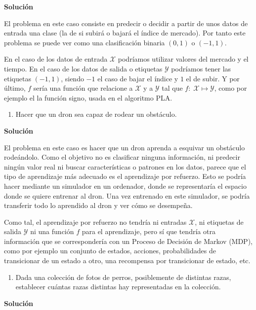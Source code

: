 \documentclass[11pt,a4paper]{article}
\newcommand{\answer}{\noindent\textbf{Solución}}
\begin{document}
\answer

El problema en este caso consiste en predecir o decidir a partir de unos datos de entrada una clase (la de si subirá o bajará
el índice de mercado). Por tanto este problema se puede ver como una clasificación binaria $(0, 1)$ o $(-1, 1)$.

En el caso de los datos de entrada $\mathcal{X}$ podríamos utilizar valores del mercado y el tiempo. En el caso de los datos
de salida o etiquetas $\mathcal{Y}$ podríamos tener las etiquetas $(-1, 1)$, siendo $-1$ el caso de bajar el índice y $1$ el
de subir. Y por último, $f$ sería una función que relacione a $\mathcal{X}$ y a $\mathcal{Y}$ tal que $f: \; \mathcal{X}
\mapsto \mathcal{Y}$, como por ejemplo el la función signo, usada en el algoritmo PLA.

\begin{enumerate}[resume,label=\textit{\alph*})]
	\item Hacer que un dron sea capaz de rodear un obstáculo.
\end{enumerate}

\answer

El problema en este caso es hacer que un dron aprenda a esquivar un obstáculo rodeándolo. Como el objetivo no es clasificar
ninguna información, ni predecir ningún valor real ni buscar características o patrones en los datos, parece que el tipo
de aprendizaje más adecuado es el aprendizaje por refuerzo. Esto se podría hacer mediante un simulador en un ordenador, donde
se representaría el espacio donde se quiere entrenar al dron. Una vez entrenado en este simulador, se podría transferir todo
lo aprendido al dron y ver cómo se desempeña.

Como tal, el aprendizaje por refuerzo no tendría ni entradas $\mathcal{X}$, ni etiquetas de salida $\mathcal{Y}$ ni una
función $f$ para el aprendizaje, pero sí que tendría otra información que se correspondería con un Proceso de Decisión de
Markov (MDP), como por ejemplo un conjunto de estados, acciones, probabilidades de transicionar de un estado a otro, una
recompensa por transicionar de estado, etc.

\begin{enumerate}[resume,label=\textit{\alph*})]
	\item Dada una colección de fotos de perros, posiblemente de distintas razas, establecer
	cuántas razas distintas hay representadas en la colección.
\end{enumerate}

\answer
\end{document}
